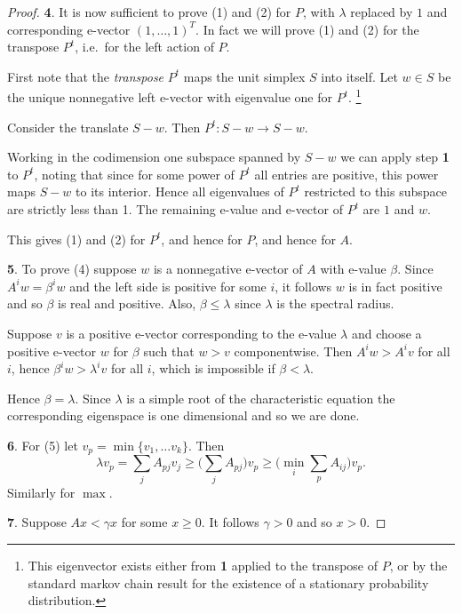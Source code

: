 \documentclass[a4paper]{amsart}
\theoremstyle{plain}
\theoremstyle{definition}
\theoremstyle{remark}
\begin{document}
\begin{proof}
\medskip \noindent \textbf{4}. It is now sufficient to prove (1) and (2) for $ P $, with $ \lambda   $ replaced by $ 1 $ and corresponding  e-vector $ (1,\dots,1)^T  $.  In fact we will prove  (1) and (2)  for   the transpose $ P^t $, i.e.\ for the left action of $ P $. 

First note that the \emph{transpose} $ P^t $ maps the unit simplex $S $  into itself.  Let $ w \in S $ be the unique nonnegative left e-vector with eigenvalue one for $ P^t $.%
\footnote{This eigenvector exists either from \textbf{1} applied to the transpose of $ P $, or by the standard markov chain result for the existence of a stationary probability distribution.}


 Consider the translate $ S - w $. Then $ P^t :S-w\to S-w $.
 
 Working in the codimension one subspace spanned by $ S-w $ we can apply step \textbf{1}   to $ P^t $, noting that since for some power of $ P^t $ all entries are positive,  this power maps $ S-w $ to its interior.  Hence all eigenvalues of $  P^t $ restricted to this subspace are strictly less than 1.  The remaining e-value and e-vector of $ P^t $ are $ 1 $ and $ w $. 
 
 This gives (1) and (2) for $ P^t  $, and hence for $ P $, and hence   for $ A $.
 
 \medskip \noindent \textbf{5}.   To prove  (4) suppose $ w  $ is a nonnegative e-vector of $ A $ with e-value $  \beta$.  Since $ A^i w = \beta ^i w $ and the left side is positive for some $ i $, it follows $ w $ is in fact positive and so $ \beta $ is real and positive.  Also, $ \beta \leq \lambda $ since $ \lambda $ is the spectral radius.
 
 Suppose $ v $ is a positive e-vector corresponding to the   e-value $ \lambda $ and choose a positive e-vector $ w $ for $ \beta $ such that $ w>v $ componentwise.   
 Then $ A^iw >  A^iv $ for all $ i $, hence $ \beta ^i w > \lambda ^i v $ for all $ i $, which is impossible if $ \beta < \lambda $.
 
Hence $ \beta = \lambda $.  Since  $ \lambda $ is a simple root of the characteristic equation the corresponding eigenspace is one dimensional and so we are done.

 \medskip \noindent \textbf{6}.  For (5) let $ v_p = \min\{v_1,\dots v_k\}$. Then
 \[
 \lambda v_p = \sum_j A_{pj} v_j \geq \bigg( \sum_j A_{pj} \bigg) v_p \geq \bigg( \min_i \sum_p A_{ij}\bigg) v_p.
 \]
 Similarly for $ \max $.
 
 \medskip \noindent \textbf{7}.    Suppose $ Ax < \gamma x $ for some $ x \geq 0 $. It follows $ \gamma > 0 $ and so $ x > 0 $.
 

\end{proof}
\end{document}
